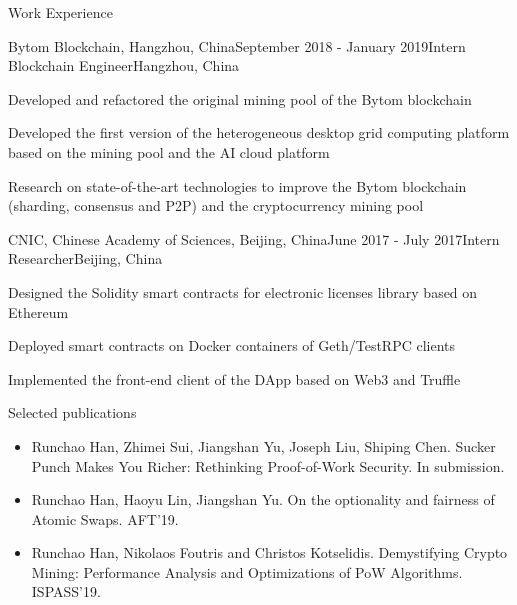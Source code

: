 \documentclass{resume} %
\begin{document}

\begin{rSection}{Work Experience}

\begin{rSubsection}{Bytom Blockchain, Hangzhou, China}{September 2018 - January 2019}{Intern Blockchain Engineer}{Hangzhou, China}
\item Developed and refactored the original mining pool of the Bytom blockchain
\item Developed the first version of the heterogeneous desktop grid computing platform based on the mining pool and the AI cloud platform
\item Research on state-of-the-art technologies to improve the Bytom blockchain (sharding, consensus and P2P) and the cryptocurrency mining pool
\end{rSubsection}

\begin{rSubsection}{CNIC, Chinese Academy of Sciences, Beijing, China}{June 2017 - July 2017}{Intern Researcher}{Beijing, China}
\item Designed the Solidity smart contracts for electronic licenses library based on Ethereum
\item Deployed smart contracts on Docker containers of Geth/TestRPC clients
\item Implemented the front-end client of the DApp based on Web3 and Truffle
\end{rSubsection}

\end{rSection}




\begin{rSection}{Selected publications} 

\begin{itemize}
    \item Runchao Han, Zhimei Sui, Jiangshan Yu, Joseph Liu, Shiping Chen. Sucker Punch Makes You Richer: Rethinking Proof-of-Work Security. In submission.
    \item Runchao Han, Haoyu Lin, Jiangshan Yu. On the optionality and fairness of Atomic Swaps. AFT'19.
    \item Runchao Han, Nikolaos Foutris and Christos Kotselidis. Demystifying Crypto Mining: Performance Analysis and Optimizations of PoW Algorithms. ISPASS'19.
\end{itemize}

\end{rSection}
\end{document}
